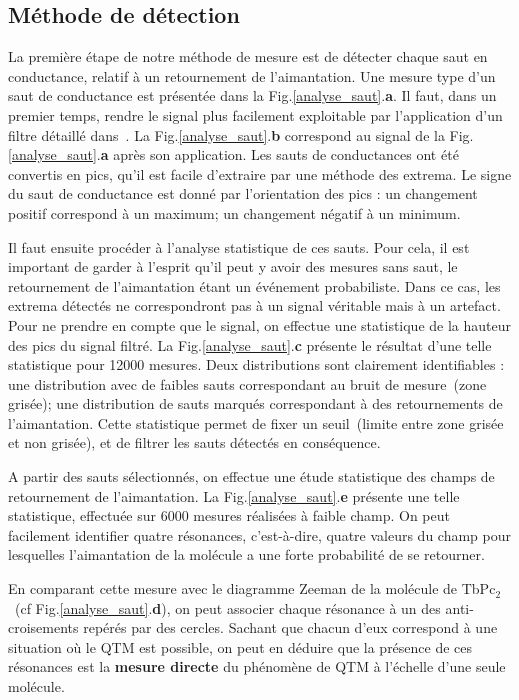 \subsection{Méthode de détection}
La première étape de notre méthode de mesure est de détecter chaque saut en conductance, relatif à un retournement de l'aimantation. Une mesure type d'un saut de conductance est présentée dans la Fig.\ref{analyse_saut}.\textbf{a}. Il faut, dans un premier temps, rendre le signal plus facilement exploitable par l'application d'un filtre détaillé dans~\cite{Y.1995}. La Fig.\ref{analyse_saut}.\textbf{b} correspond au signal de la Fig.\ref{analyse_saut}.\textbf{a} après son application. Les sauts de conductances ont été convertis en pics, qu'il est facile d'extraire par une méthode des extrema. Le signe du saut de conductance est donné par l'orientation des pics : un changement positif correspond à un maximum; un changement négatif à un minimum.

Il faut ensuite procéder à l'analyse statistique de ces sauts. Pour cela, il est important de garder à l'esprit qu'il peut y avoir des mesures sans saut, le retournement de l'aimantation étant un événement probabiliste. Dans ce cas, les extrema détectés ne correspondront pas à un signal véritable mais à un artefact. Pour ne prendre en compte que le signal, on effectue une statistique de la hauteur des pics du signal filtré. La Fig.\ref{analyse_saut}.\textbf{c} présente le résultat d'une telle statistique pour 12000 mesures. Deux distributions sont clairement identifiables : une distribution avec de faibles sauts correspondant au bruit de mesure~(zone grisée); une distribution de sauts marqués correspondant à des retournements de l'aimantation. Cette statistique permet de fixer un seuil~(limite entre zone grisée et non grisée), et de filtrer les sauts détectés en conséquence.

A partir des sauts sélectionnés, on effectue une étude statistique des champs de retournement de l'aimantation. La Fig.\ref{analyse_saut}.\textbf{e} présente une telle statistique, effectuée sur 6000 mesures réalisées à faible champ. On peut facilement identifier quatre résonances, c'est-à-dire, quatre valeurs du champ pour lesquelles l'aimantation de la molécule a une forte probabilité de se retourner. 

En comparant cette mesure avec le diagramme Zeeman de la molécule de TbPc$_2$~(cf Fig.\ref{analyse_saut}.\textbf{d}), on peut associer chaque résonance à un des anti-croisements repérés par des cercles. Sachant que chacun d'eux correspond à une situation où le QTM est possible, on peut en déduire que la présence de ces résonances est la \textbf{mesure directe} du phénomène de QTM à l'échelle d'une seule molécule. 

